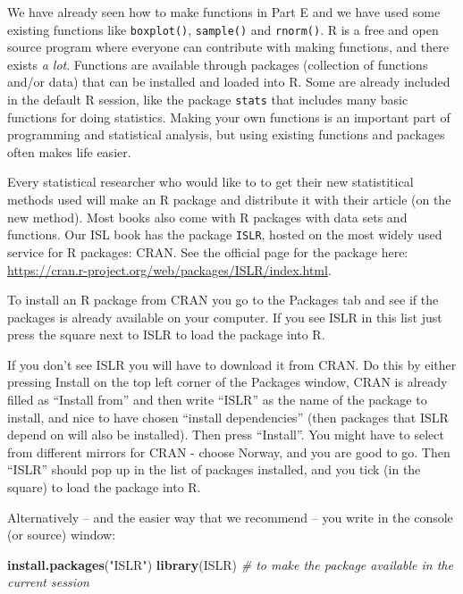\documentclass[]{article}
\newenvironment{Shaded}{\begin{snugshade}}{\end{snugshade}}
\newcommand{\KeywordTok}[1]{\textcolor[rgb]{0.13,0.29,0.53}{\textbf{#1}}}
\newcommand{\StringTok}[1]{\textcolor[rgb]{0.31,0.60,0.02}{#1}}
\newcommand{\CommentTok}[1]{\textcolor[rgb]{0.56,0.35,0.01}{\textit{#1}}}
\newcommand{\NormalTok}[1]{#1}
\begin{document}
We have already seen how to make functions in Part E and we have used
some existing functions like \texttt{boxplot()}, \texttt{sample()} and
\texttt{rnorm()}. R is a free and open source program where everyone can
contribute with making functions, and there exists \emph{a lot}.
Functions are available through packages (collection of functions and/or
data) that can be installed and loaded into R. Some are already included
in the default R session, like the package \texttt{stats} that includes
many basic functions for doing statistics. Making your own functions is
an important part of programming and statistical analysis, but using
existing functions and packages often makes life easier.

Every statistical researcher who would like to to get their new
statistitical methods used will make an R package and distribute it with
their article (on the new method). Most books also come with R packages
with data sets and functions. Our ISL book has the package
\texttt{ISLR}, hosted on the most widely used service for R packages:
CRAN. See the official page for the package here:
\url{https://cran.r-project.org/web/packages/ISLR/index.html}.

To install an R package from CRAN you go to the Packages tab and see if
the packages is already available on your computer. If you see ISLR in
this list just press the square next to ISLR to load the package into R.

If you don't see ISLR you will have to download it from CRAN. Do this by
either pressing Install on the top left corner of the Packages window,
CRAN is already filled as ``Install from'' and then write ``ISLR'' as
the name of the package to install, and nice to have chosen ``install
dependencies'' (then packages that ISLR depend on will also be
installed). Then press ``Install''. You might have to select from
different mirrors for CRAN - choose Norway, and you are good to go. Then
``ISLR'' should pop up in the list of packages installed, and you tick
(in the square) to load the package into R.

Alternatively -- and the easier way that we recommend -- you write in
the console (or source) window:

\begin{Shaded}
\begin{Highlighting}[]
\KeywordTok{install.packages}\NormalTok{(}\StringTok{"ISLR"}\NormalTok{)}
\KeywordTok{library}\NormalTok{(ISLR)  }\CommentTok{# to make the package available in the current session}
\end{Highlighting}
\end{Shaded}
\end{document}
